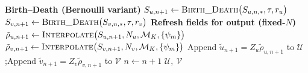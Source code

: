 \documentclass[12pt]{article}
\begin{document}
\begin{algorithm}
\begin{algorithmic}
    \State \textbf{Birth--Death (Bernoulli variant)}
    \State $S_{u,n+1} \gets \textsc{Birth\_Death}\big(S_{u,n,*},\tau,r_u\big)$
    \State $S_{v,n+1} \gets \textsc{Birth\_Death}\big(S_{v,n,*},\tau,r_v\big)$
    \State \textbf{Refresh fields for output (fixed-$N$)}
    \State $\tilde\rho_{u,n+1} \gets \textsc{Interpolate}\big(S_{u,n+1},N_u,\mathcal M_K,\{\psi_m\}\big)$
    \State $\tilde\rho_{v,n+1} \gets \textsc{Interpolate}\big(S_{v,n+1},N_v,\mathcal M_K,\{\psi_m\}\big)$
    \State Append $\tilde u_{n+1}=Z_u\tilde\rho_{u,n+1}$ to $\mathcal U$;\quad Append $\tilde v_{n+1}=Z_v\tilde\rho_{v,n+1}$ to $\mathcal V$
    \State $n\gets n+1$
  \EndWhile
  \State \Return $\mathcal U,\ \mathcal V$
\EndProcedure
\end{algorithmic}
\end{algorithm}





\end{document}
